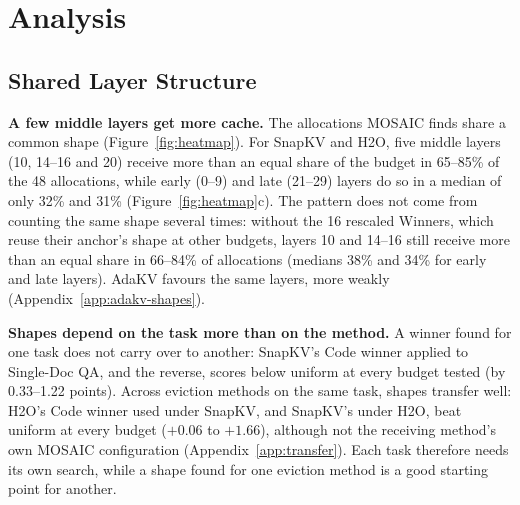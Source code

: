 \documentclass[11pt]{article}
\begin{document}
\section{Analysis}



\subsection{Shared Layer Structure}
\label{sec:shared}

\textbf{A few middle layers get more cache.} The allocations MOSAIC finds share a common shape (Figure~\ref{fig:heatmap}). For SnapKV and H2O, five middle layers (10, 14--16 and 20) receive more than an equal share of the budget in 65--85\% of the 48 allocations, while early (0--9) and late (21--29) layers do so in a median of only 32\% and 31\% (Figure~\ref{fig:heatmap}c). The pattern does not come from counting the same shape several times: without the 16 rescaled Winners, which reuse their anchor's shape at other budgets, layers 10 and 14--16 still receive more than an equal share in 66--84\% of allocations (medians 38\% and 34\% for early and late layers). AdaKV favours the same layers, more weakly (Appendix~\ref{app:adakv-shapes}).

\textbf{Shapes depend on the task more than on the method.} A winner found for one task does not carry over to another: SnapKV's Code winner applied to Single-Doc QA, and the reverse, scores below uniform at every budget tested (by 0.33--1.22 points). Across eviction methods on the same task, shapes transfer well: H2O's Code winner used under SnapKV, and SnapKV's under H2O, beat uniform at every budget ($+0.06$ to $+1.66$), although not the receiving method's own MOSAIC configuration (Appendix~\ref{app:transfer}). Each task therefore needs its own search, while a shape found for one eviction method is a good starting point for another.
\end{document}
